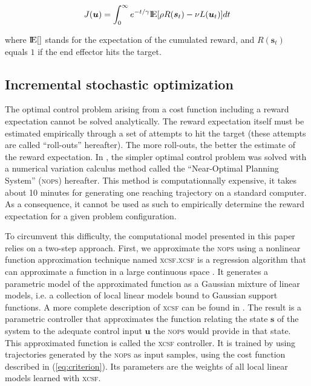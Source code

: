 \documentclass[10pt]{article}
\def\bbbe{{\rm I\!E}}
\newcommand{\E}{{\bbbe}{}}
\newcommand\ops{\textsc{nops}\xspace}
\newcommand\xcsf{\textsc{xcsf}\xspace}
\newcommand{\rols}{roll-outs\xspace}
\renewcommand\vec[1]{\boldsymbol{#1}} %
\begin{document}
\begin{equation}
\label{eq:expectation}
 J(\vec{u}) = \int_0^{\infty} e^{-t/\gamma} \E[ \rho R(\vec{s}_t) - \nu L(\vec{u}_t) ] dt
\end{equation}

where $\E[]$ stands for the expectation of the cumulated reward, and $R(\vec{s}_t)$  equals $1$ if the end effector hits the target.

\subsection{Incremental stochastic optimization}
\label{sec:xcsf_ceps}

The optimal control problem arising from a cost function including a reward expectation cannot be solved analytically. The reward expectation itself must be estimated empirically through a set of attempts to hit the target (these attempts are called ``\rols'' hereafter). The more \rols, the better the estimate of the reward expectation. In \cite{rigoux12}, the simpler optimal control problem was solved with a numerical variation calculus method called the ``Near-Optimal Planning System'' (\ops) hereafter. This method is computationnally expensive, it takes about 10 minutes for generating one reaching trajectory on a standard computer. As a consequence, it cannot be used as such to empirically determine the reward expectation for a given problem configuration.

To circumvent this difficulty, the computational model presented in this paper relies on a two-step approach. First, we approximate the \ops using a nonlinear function approximation technique named \xcsf.\xcsf is a regression algorithm that can approximate a function in a large continuous space \cite{wilson2001,wilson2002}. It generates a parametric model of the approximated function as a Gaussian mixture of linear models, i.e. a collection of local linear models bound to Gaussian support functions. A more complete description of \xcsf can be found in \cite{butz2004,butz2008,sigaud11_ras}. The result is a parametric controller that approximates the function relating the state $\vec{s}$ of the system to the adequate control input $\vec{u}$ the \ops would provide in that state.
This approximated function is called the \xcsf controller. It is trained by using trajectories generated by the \ops as input samples, using  the cost function described in (\ref{eq:criterion}). Its parameters are the weights of all local linear models learned with \xcsf.
\end{document}
